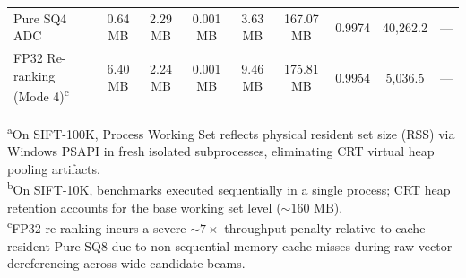 \begin{table}[t]
\begin{tabular}{lcccccccc}
Pure SQ4 ADC & 0.64 MB & 2.29 MB & 0.001 MB & 3.63 MB & 167.07 MB & 0.9974 & 40{,}262.2 & --- \\
FP32 Re-ranking (Mode 4)\textsuperscript{c} & 6.40 MB & 2.24 MB & 0.001 MB & 9.46 MB & 175.81 MB & 0.9954 & 5{,}036.5 & --- \\
\bottomrule
\end{tabular}
\vspace{1ex}
\raggedright
\footnotesize{\textsuperscript{a}On SIFT-100K, Process Working Set reflects physical resident set size (RSS) via Windows PSAPI in fresh isolated subprocesses, eliminating CRT virtual heap pooling artifacts. \\
\textsuperscript{b}On SIFT-10K, benchmarks executed sequentially in a single process; CRT heap retention accounts for the base working set level ($\sim 160$ MB). \\
\textsuperscript{c}FP32 re-ranking incurs a severe $\sim 7\times$ throughput penalty relative to cache-resident Pure SQ8 due to non-sequential memory cache misses during raw vector dereferencing across wide candidate beams.}
\end{table}
